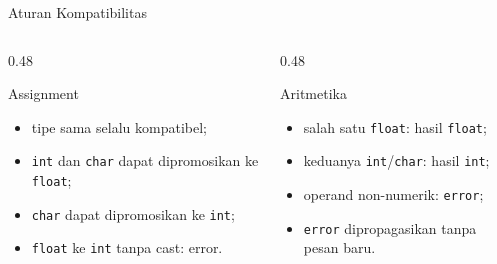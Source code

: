 \documentclass[aspectratio=169,10pt,t]{beamer}
\begin{document}
\begin{frame}{Aturan Kompatibilitas}
  \begin{columns}[T,onlytextwidth]
    \begin{column}{0.48\textwidth}
      \begin{block}{Assignment}
        \footnotesize
        \begin{itemize}
          \item tipe sama selalu kompatibel;
          \item \texttt{int} dan \texttt{char} dapat dipromosikan ke
                \texttt{float};
          \item \texttt{char} dapat dipromosikan ke \texttt{int};
          \item \texttt{float} ke \texttt{int} tanpa cast: error.
        \end{itemize}
      \end{block}
    \end{column}
    \begin{column}{0.48\textwidth}
      \begin{block}{Aritmetika}
        \footnotesize
        \begin{itemize}
          \item salah satu \texttt{float}: hasil \texttt{float};
          \item keduanya \texttt{int}/\texttt{char}: hasil
                \texttt{int};
          \item operand non-numerik: \texttt{error};
          \item \texttt{error} dipropagasikan tanpa pesan baru.
        \end{itemize}
      \end{block}
    \end{column}
  \end{columns}
\end{frame}
\end{document}
